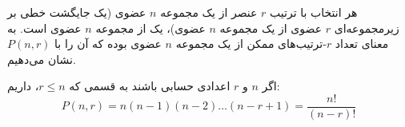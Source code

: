 \begin{definition}
    هر انتخاب با ترتیب
    $r$
    عنصر از یک مجموعه
    $n$
    عضوی
    (یک جایگشت خطی بر زیرمجموعه‌ای 
    $r$
    عضوی از یک مجموعه
    $n$
    عضوی)،
    یک
    از مجموعه
    $n$
    عضوی است.
    به معنای تعداد
    $r$-ترتیب‌های ممکن
    از یک مجموعه $n$ عضوی
    بوده که آن را با 
    $P(n,r)$ نشان می‌دهیم. 
\end{definition}

\begin{fact}
    اگر $n$ و $r$ اعدادی حسابی باشند به قسمی که 
    $r\leq n$، داریم:
    $$P(n,r) = n(n-1)(n-2)...(n-r+1) = \frac{n!}{(n-r)!}$$
\end{fact}


